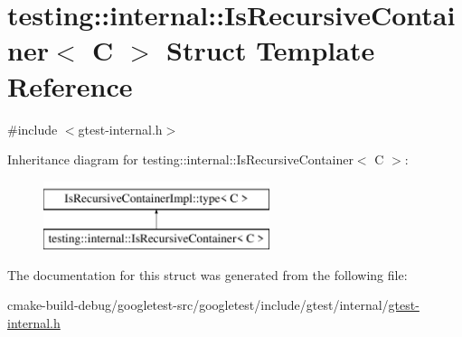 \hypertarget{structtesting_1_1internal_1_1IsRecursiveContainer}{}\section{testing\+::internal\+::Is\+Recursive\+Container$<$ C $>$ Struct Template Reference}
\label{structtesting_1_1internal_1_1IsRecursiveContainer}


{\ttfamily \#include $<$gtest-\/internal.\+h$>$}

Inheritance diagram for testing\+::internal\+::Is\+Recursive\+Container$<$ C $>$\+:\begin{figure}[H]
\begin{center}
\leavevmode
\includegraphics[height=2.000000cm]{structtesting_1_1internal_1_1IsRecursiveContainer}
\end{center}
\end{figure}


The documentation for this struct was generated from the following file\+:\begin{DoxyCompactItemize}
\item 
cmake-\/build-\/debug/googletest-\/src/googletest/include/gtest/internal/\mbox{\hyperlink{gtest-internal_8h}{gtest-\/internal.\+h}}\end{DoxyCompactItemize}
